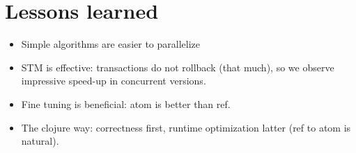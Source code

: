 	\section{Lessons learned}
	\label{sec:lessons-learned}
		\begin{itemize}
			\item Simple algorithms are easier to parallelize
			\item STM is effective: transactions do not rollback (that much), so we observe impressive speed-up in concurrent versions.
			\item Fine tuning is beneficial: atom is better than ref.
			\item The clojure way: correctness first, runtime optimization latter (ref to atom is natural).
		\end{itemize}